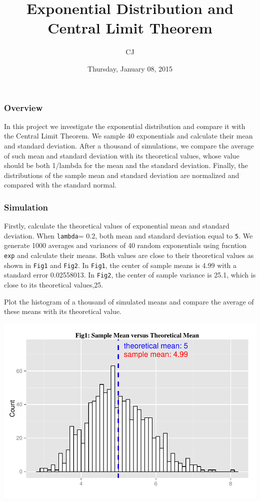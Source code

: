 \documentclass[]{article}
\title{Exponential Distribution and Central Limit Theorem}
\author{CJ}
\date{Thursday, January 08, 2015}
\begin{document}
\maketitle


\subsubsection{Overview}\label{overview}

In this project we investigate the exponential distribution and compare
it with the Central Limit Theorem. We sample 40 exponentials and
calculate their mean and standard deviation. After a thousand of
simulations, we compare the average of such mean and standard deviation
with its theoretical values, whose value should be both 1/lambda for the
mean and the standard deviation. Finally, the distributions of the
sample mean and standard deviation are normalized and compared with the
standard normal.

\subsubsection{Simulation}\label{simulation}

Firstly, calculate the theoretical values of exponential mean and
standard deviation. When \texttt{lambda}= 0.2, both mean and standard
deviation equal to \texttt{5}. We generate 1000 averages and variances
of 40 random exponentials using fucntion \texttt{exp} and calculate
their means. Both values are close to their theoretical values as shown
in \texttt{Fig1} and \texttt{Fig2}. In \texttt{Fig1}, the center of
sample means is 4.99 with a standard error 0.02558013. In \texttt{Fig2},
the center of sample variance is 25.1, which is close to its theoretical
values,25.

Plot the histogram of a thousand of simulated means and compare the
average of these means with its theoretical value.

\includegraphics{PA1pdf_files/figure-latex/unnamed-chunk-3-1.pdf}
\end{document}
